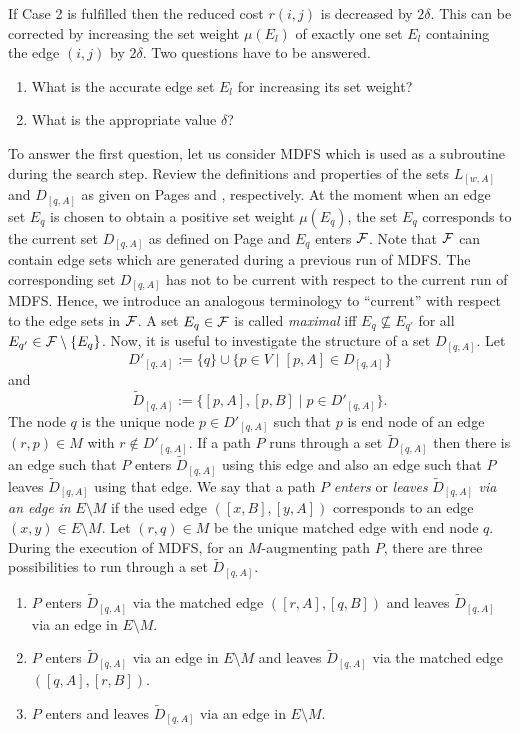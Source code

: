 \documentclass[12pt,twoside,a4paper]{article}
\begin{document}
If Case 2 is fulfilled then the reduced cost $r(i,j)$ is decreased by 
$2\delta$. This can be corrected by increasing the set weight $\mu(E_l)$ of
exactly one set $E_l$ containing the edge $(i,j)$ by $2\delta$.
Two questions have to be answered.
\begin{enumerate}
\item
What is the accurate edge set $E_l$ for increasing its set weight?
\item
What is the appropriate value $\delta$?
\end{enumerate}
To answer the first question, let us consider MDFS which is used as a subroutine 
during the search step. 
Review the definitions and properties of the sets $L_{[w,A]}$ and $D_{[q,A]}$ as given 
on Pages \pageref{WM1} and \pageref{WM2}, respectively. At the moment when an edge set $E_q$ 
is chosen to obtain a positive set weight $\mu(E_q)$, the set $E_q$ corresponds to the 
current set $D_{[q,A]}$ as defined on Page \pageref{WM2} and $E_q$ enters $\cal F$.
Note that $\cal F$ can contain edge sets which are generated during a previous run
of MDFS. The corresponding set $D_{[q,A]}$ has not to be current with respect to the
current run of MDFS. Hence, we introduce an analogous terminology to ``current'' with
respect to the edge sets in $\cal F$.
A set $E_q \in \cal F$ is called {\em maximal\/} iff $E_q \not\subseteq E_{q'}$ for all
$E_{q'} \in {\cal F} \setminus \{E_q\}$.
Now, it is useful to investigate the structure of a set $D_{[q,A]}$. Let
$$D'_{[q,A]} := \{q\} \cup \{p \in V \mid [p,A] \in D_{[q,A]}\}$$
and
$$\tilde D_{[q,A]} := \{[p,A],[p,B] \mid p \in D'_{[q,A]}\}.$$
The node $q$ is the unique node $p \in D'_{[q,A]}$ such that $p$ is end node of an
edge $(r,p) \in M$ with $r \not\in D'_{[q,A]}$. 
If a path $P$ runs through a set $\tilde{D}_{[q,A]}$ then there is an edge such
that $P$ enters $\tilde{D}_{[q,A]}$ using this edge and also an edge such that $P$ 
leaves $\tilde{D}_{[q,A]}$ using that edge. 
We say that a path $P$ {\em enters\/} or {\em leaves\/} $\tilde D_{[q,A]}$ 
{\em via an edge\/} {\em in\/} $E \setminus M$ if the used edge $([x,B],[y,A])$ 
corresponds to an edge $(x,y) \in E \setminus M$.
Let $(r,q) \in M$ be the unique matched edge with end node $q$. 
During the execution of MDFS, for an $M$-augmenting path $P$, there are three 
possibilities to run through a set $\tilde D_{[q,A]}$.
\begin{enumerate}
\item
$P$ enters $\tilde D_{[q,A]}$ via the matched edge $([r,A],[q,B])$ and leaves
$\tilde D_{[q,A]}$ via an edge in $E \setminus M$.
\item
$P$ enters $\tilde D_{[q,A]}$ via an edge in $E \setminus M$ and leaves 
$\tilde D_{[q,A]}$ via the matched edge $([q,A],[r,B])$.
\item
$P$ enters and leaves $\tilde D_{[q,A]}$ via an edge in $E \setminus M$.
\end{enumerate}
\end{document}
